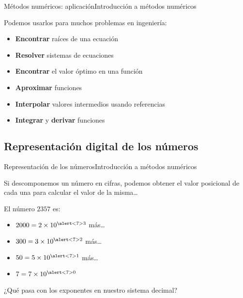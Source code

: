 \documentclass[spanish, c]{beamer}
\begin{document}
\begin{frame}{Métodos numéricos: aplicación}{Introducción a métodos numéricos}
    
    Podemos usarlos para muchos problemas en ingeniería:

    \bigskip
    
    \begin{itemize}[<+->]
        \item \textbf{Encontrar} raíces de una ecuación
        \item \textbf{Resolver} sistemas de ecuaciones
        \item \textbf{Encontrar} el valor óptimo en una función
        \item \textbf{Aproximar} funciones
        \item \textbf{Interpolar} valores intermedios usando referencias
        \item \textbf{Integrar}  y \textbf{derivar} funciones
    \end{itemize}
\end{frame}

\subsection{Representación digital de los números}

\begin{frame}{Representación de los números}{Introducción a métodos numéricos}

    Si descomponemos un número en cifras, podemos obtener el valor posicional de cada una para calcular el valor de la misma\dots \pause

    El número $2357$ es:

    \begin{itemize}
        \item $2000 = 2 \times 10^{\alert<7>{3}}$ más\dots \pause
        \item $300 = 3 \times 10^{\alert<7>{2}}$ más\dots \pause
        \item $50 = 5 \times 10^{\alert<7>{1}}$ más\dots \pause
        \item $7 = 7 \times 10^{\alert<7>{0}}$ \pause
    \end{itemize}

    \bigskip

    ¿Qué pasa con los exponentes en nuestro sistema decimal? \pause

\end{frame}
\end{document}
